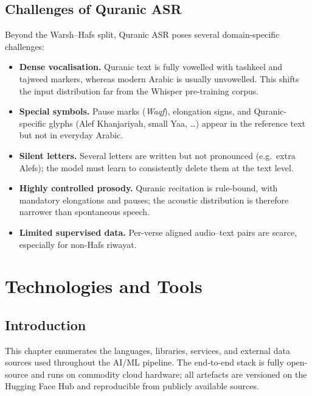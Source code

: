 \section{Challenges of Quranic ASR}
\label{sec:mt_quran_asr_challenges}

Beyond the Warsh--Hafs split, Quranic ASR poses several domain-specific
challenges:

\begin{itemize}
  \item \textbf{Dense vocalisation.} Quranic text is fully vowelled with
        tashkeel and tajweed markers, whereas modern Arabic is usually
        unvowelled. This shifts the input distribution far from the
        Whisper pre-training corpus.
  \item \textbf{Special symbols.} Pause marks (\textit{Waqf}), elongation
        signs, and Quranic-specific glyphs (Alef Khanjariyah, small Yaa,
        \dots) appear in the reference text but not in everyday Arabic.
  \item \textbf{Silent letters.} Several letters are written but not
        pronounced (e.g.\ extra Alefs); the model must learn to
        consistently delete them at the text level.
  \item \textbf{Highly controlled prosody.} Quranic recitation is rule-bound,
        with mandatory elongations and pauses; the acoustic distribution
        is therefore narrower than spontaneous speech.
  \item \textbf{Limited supervised data.} Per-verse aligned audio--text
        pairs are scarce, especially for non-Hafs riwayat.
\end{itemize}

\chapter{Technologies and Tools}
\label{ch:mt_tech}

\section{Introduction}
This chapter enumerates the languages, libraries, services, and external
data sources used throughout the AI/ML pipeline. The end-to-end stack is
fully open-source and runs on commodity cloud hardware; all artefacts are
versioned on the Hugging Face Hub and reproducible from publicly available
sources.

